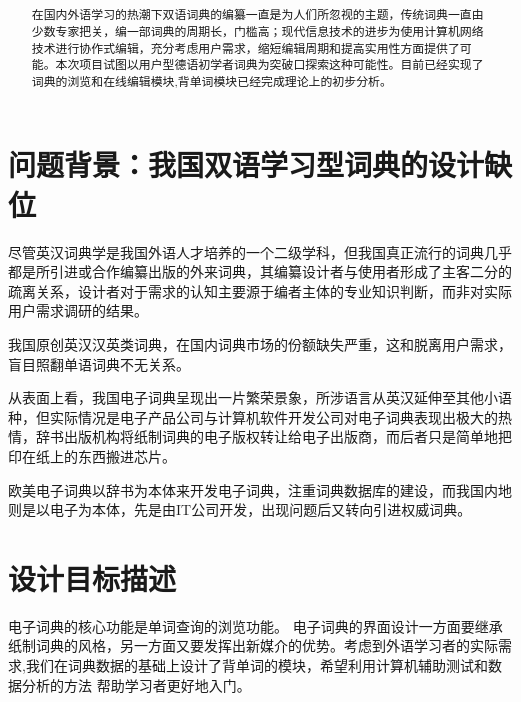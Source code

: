 \documentclass[12pt]{article}
\begin{document}
\title{\textbf{}}
\author{}

\maketitle
\renewcommand{\abstractname}{摘要}
\renewcommand*\contentsname{目录}
\begin{abstract}
在国内外语学习的热潮下双语词典的编纂一直是为人们所忽视的主题，传统词典一直由少数专家把关，编一部词典的周期长，门槛高；现代信息技术的进步为使用计算机网络技术进行协作式编辑，充分考虑用户需求，缩短编辑周期和提高实用性方面提供了可能。本次项目试图以用户型德语初学者词典为突破口探索这种可能性。目前已经实现了词典的浏览和在线编辑模块,背单词模块已经完成理论上的初步分析。
\end{abstract}
\tableofcontents
\large
\twocolumn
\setlength{\columnseprule}{1pt}

\section[问题背景]{问题背景：我国双语学习型词典的设计缺位}
尽管英汉词典学是我国外语人才培养的一个二级学科，但我国真正流行的词典几乎都是所引进或合作编纂出版的外来词典，其编纂设计者与使用者形成了主客二分的疏离关系，设计者对于需求的认知主要源于编者主体的专业知识判断，而非对实际用户需求调研的结果。\cite{Bib1}

我国原创英汉汉英类词典，在国内词典市场的份额缺失严重，这和脱离用户需求，盲目照翻单语词典不无关系。

从表面上看，我国电子词典呈现出一片繁荣景象，所涉语言从英汉延伸至其他小语种，但实际情况是电子产品公司与计算机软件开发公司对电子词典表现出极大的热情，辞书出版机构将纸制词典的电子版权转让给电子出版商，而后者只是简单地把印在纸上的东西搬进芯片。

欧美电子词典以辞书为本体来开发电子词典，注重词典数据库的建设，而我国内地则是以电子为本体，先是由IT公司开发，出现问题后又转向引进权威词典。\cite{Bib2}

\section{设计目标描述}
	电子词典的核心功能是单词查询的浏览功能。
	电子词典的界面设计一方面要继承纸制词典的风格，另一方面又要发挥出新媒介的优势。考虑到外语学习者的实际需求,我们在词典数据的基础上设计了背单词的模块，希望利用计算机辅助测试和数据分析的方法
	帮助学习者更好地入门。
	
\end{document}
